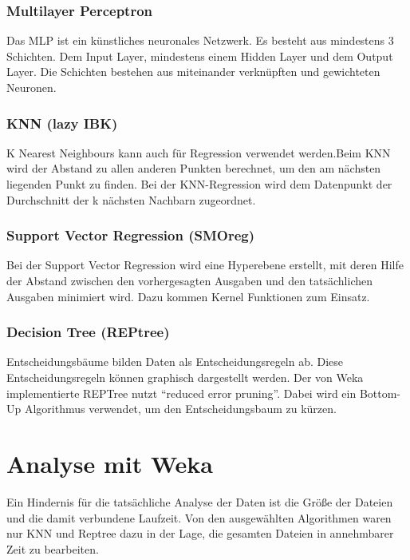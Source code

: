 \documentclass[letterpaper]{article} %
\begin{document}
    \subsubsection*{Multilayer Perceptron}
        Das MLP ist ein künstliches neuronales Netzwerk. Es besteht aus mindestens 3 Schichten. Dem Input Layer, mindestens einem Hidden Layer und dem Output Layer. Die Schichten bestehen aus miteinander verknüpften und gewichteten Neuronen. 
    
    \subsubsection*{KNN (lazy IBK)}
        K Nearest Neighbours kann auch für Regression verwendet werden.Beim KNN wird der Abstand zu allen anderen Punkten berechnet, um den am nächsten liegenden Punkt zu finden. Bei der KNN-Regression wird dem Datenpunkt der Durchschnitt der k nächsten Nachbarn zugeordnet.
    
    \subsubsection*{Support Vector Regression (SMOreg)}
        Bei der Support Vector Regression wird eine Hyperebene erstellt, mit deren Hilfe der Abstand zwischen den vorhergesagten Ausgaben und den tatsächlichen Ausgaben minimiert wird. Dazu kommen Kernel Funktionen zum Einsatz.
    
    \subsubsection*{Decision Tree (REPtree)}
        Entscheidungsbäume bilden Daten als Entscheidungsregeln ab. Diese Entscheidungsregeln können graphisch dargestellt werden. Der von Weka implementierte REPTree nutzt “reduced error pruning”. Dabei wird ein Bottom-Up Algorithmus verwendet, um den Entscheidungsbaum zu kürzen.
    

\section*{Analyse mit Weka}
    Ein Hindernis für die tatsächliche Analyse der Daten ist die Größe der Dateien und die damit verbundene Laufzeit. Von den ausgewählten Algorithmen waren nur KNN und Reptree dazu in der Lage, die gesamten Dateien in annehmbarer Zeit zu bearbeiten.
    
\end{document}
